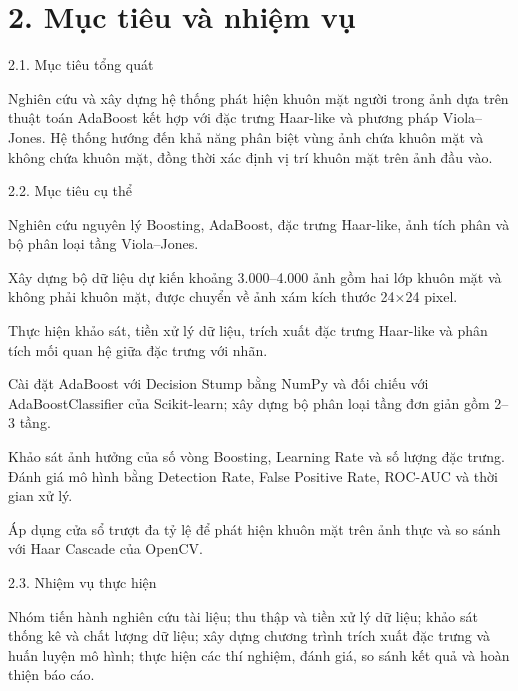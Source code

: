 \documentclass[12pt,a4paper,oneside]{report}
\begin{document}
\section*{2. Mục tiêu và nhiệm vụ}
{ 2.1. Mục tiêu tổng quát

Nghiên cứu và xây dựng hệ thống phát hiện khuôn mặt người trong ảnh dựa trên thuật toán AdaBoost kết hợp với đặc trưng Haar-like và phương pháp Viola–Jones. Hệ thống hướng đến khả năng phân biệt vùng ảnh chứa khuôn mặt và không chứa khuôn mặt, đồng thời xác định vị trí khuôn mặt trên ảnh đầu vào.

2.2. Mục tiêu cụ thể

Nghiên cứu nguyên lý Boosting, AdaBoost, đặc trưng Haar-like, ảnh tích phân và bộ phân loại tầng Viola–Jones.

Xây dựng bộ dữ liệu dự kiến khoảng 3.000–4.000 ảnh gồm hai lớp khuôn mặt và không phải khuôn mặt, được chuyển về ảnh xám kích thước 24×24 pixel.

Thực hiện khảo sát, tiền xử lý dữ liệu, trích xuất đặc trưng Haar-like và phân tích mối quan hệ giữa đặc trưng với nhãn.

Cài đặt AdaBoost với Decision Stump bằng NumPy và đối chiếu với AdaBoostClassifier của Scikit-learn; xây dựng bộ phân loại tầng đơn giản gồm 2–3 tầng.

Khảo sát ảnh hưởng của số vòng Boosting, Learning Rate và số lượng đặc trưng. Đánh giá mô hình bằng Detection Rate, False Positive Rate, ROC-AUC và thời gian xử lý.

Áp dụng cửa sổ trượt đa tỷ lệ để phát hiện khuôn mặt trên ảnh thực và so sánh với Haar Cascade của OpenCV.

2.3. Nhiệm vụ thực hiện

Nhóm tiến hành nghiên cứu tài liệu; thu thập và tiền xử lý dữ liệu; khảo sát thống kê và chất lượng dữ liệu; xây dựng chương trình trích xuất đặc trưng và huấn luyện mô hình; thực hiện các thí nghiệm, đánh giá, so sánh kết quả và hoàn thiện báo cáo.}
\end{document}
